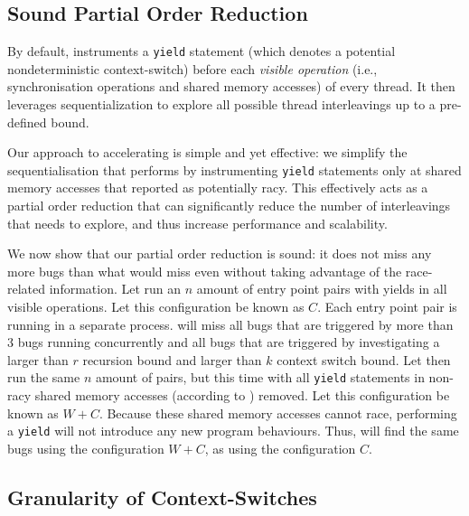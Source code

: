 \subsection{Sound Partial Order Reduction}
\label{bf:reduction}

By default, \corral instruments a \texttt{yield} statement (which denotes a
potential nondeterministic context-switch) before each \emph{visible operation}
(i.e., synchronisation operations and shared memory accesses) of every thread.
It then leverages sequentialization to explore all possible thread interleavings
up to a pre-defined bound.

Our approach to accelerating \corral is simple and yet effective: we simplify
the sequentialisation that \corral performs by instrumenting \texttt{yield}
statements only at shared memory accesses that \whoop reported as potentially
racy. This effectively acts as a partial order reduction that can significantly
reduce the number of interleavings that \corral needs to explore, and thus
increase performance and scalability.

We now show that our partial order reduction is sound: it does not miss any more
bugs than what \corral would miss even without taking advantage of the \whoop
race-related information. Let \corral run an $n$ amount of entry point pairs
with yields in all visible operations. Let this configuration be known as $C$.
Each entry point pair is running in a separate \corral process. \corral will
miss all bugs that are triggered by more than 3 bugs running concurrently and
all bugs that are triggered by investigating a larger than $r$ recursion bound
and larger than $k$ context switch bound. Let \corral then run the same $n$
amount of pairs, but this time with all \texttt{yield} statements in non-racy
shared memory accesses (according to \whoop) removed. Let this configuration be
known as $W+C$. Because these shared memory accesses cannot race, performing a
\texttt{yield} will not introduce any new program behaviours. Thus, \corral will
find the same bugs using the configuration $W+C$, as using the configuration
$C$.

\subsection{Granularity of Context-Switches}
\label{bf:granularity}

